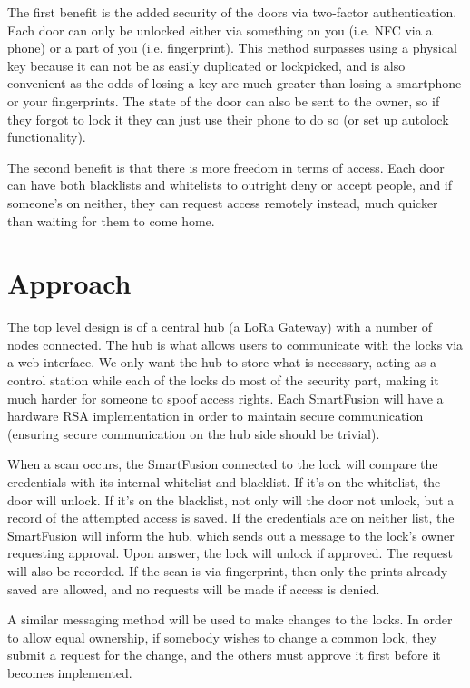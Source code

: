 \documentclass{article}
\begin{document}
The first benefit is the added security of the doors via two-factor
authentication. Each door can only be unlocked either via something on you (i.e.
NFC via a phone) or a part of you (i.e. fingerprint). This method
surpasses using a physical key because it can not be as easily duplicated or
lockpicked, and is also convenient as the odds of losing a key are much greater
than losing a smartphone or your fingerprints. The state of the door can also be
sent to the owner, so if they forgot to lock it they can just use their phone to
do so (or set up autolock functionality).

The second benefit is that there is more freedom in terms of access. Each door
can have both blacklists and whitelists to outright deny or accept people, and
if someone's on neither, they can request access remotely instead, much quicker
than waiting for them to come home. 

\section{Approach}

The top level design is of a central hub (a LoRa Gateway) with a number of nodes connected. The
hub is what allows users to communicate with the locks via a web interface. We
only want the hub to store what is necessary, acting as a control station while
each of the locks do most of the security part, making it much harder for
someone to spoof access rights. Each SmartFusion will have a hardware RSA
implementation in order to maintain secure communication (ensuring secure
communication on the hub side should be trivial).

When a scan occurs, the SmartFusion connected to the lock will compare the
credentials with its internal whitelist
and blacklist. If it's on the whitelist, the door will unlock. If it's on the
blacklist, not only will the door not unlock, but a record of the attempted
access is saved. If the credentials are on neither list, the SmartFusion will inform the hub,
which sends out a message to the lock's owner requesting approval. Upon
answer, the lock will unlock if approved. The request will also be recorded. If
the scan is via fingerprint, then only the prints already saved are allowed, and
no requests will be made if access is denied.

A similar messaging method will be used to make changes to the locks. In
order to allow equal ownership, if somebody wishes to change a common lock, they
submit a request for the change, and the others must approve it first before it
becomes implemented.
\end{document}
